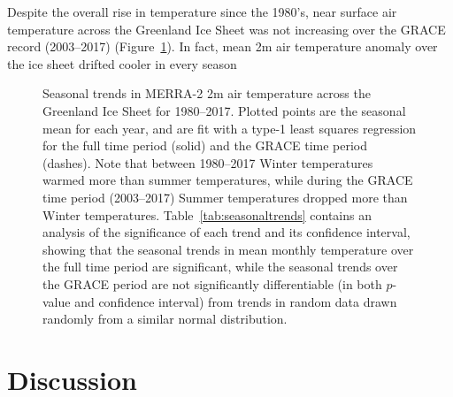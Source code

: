 \documentclass[11pt]{report}
\begin{document}


Despite the overall rise in temperature since the 1980's, near surface air temperature across the Greenland Ice Sheet was not increasing over the GRACE record (2003--2017) (Figure~\ref{fig:seasonalclimate}). In fact, mean 2m air temperature anomaly over the ice sheet drifted cooler in every season

 \begin{figure}[h]
\centering
{}
\caption[Seasonal 2m temperature trends over the Greenland Ice Sheet: 1980--2017]{Seasonal trends in MERRA-2 2m air temperature across the Greenland Ice Sheet for 1980--2017. Plotted points are the seasonal mean for each year, and are fit with a type-1 least squares regression for the full time period (solid) and the GRACE time period (dashes). Note that between 1980--2017 Winter temperatures warmed more than summer temperatures, while during the GRACE time period (2003--2017) Summer temperatures dropped more than Winter temperatures. Table~\ref{tab:seasonaltrends} contains an analysis of the significance of each trend and its confidence interval, showing that the seasonal trends in mean monthly temperature over the full time period are significant, while the seasonal trends over the GRACE period are not significantly differentiable (in both $p$-value and confidence interval) from trends in random data drawn randomly from a similar normal distribution. \label{fig:seasonalclimate}}
\end{figure}


 \begin{figure}[h]
\centering
{}
\caption[]{} \label{fig:sp}
\end{figure}

\section{Discussion}
\end{document}
